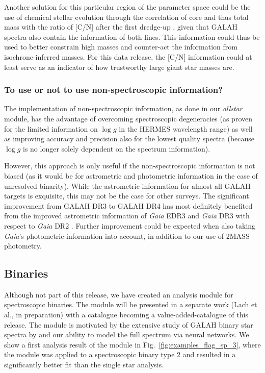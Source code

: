 \documentclass[
  journal=pasa,
  manuscript=research-paper, %
  year=2024,
  volume=37
]{cup-journal}
\newcommand{\logg}{$\log g$\xspace}
\begin{document}
Another solution for this particular region of the parameter space could be the use of chemical stellar evolution through the correlation of core and thus total mass with the ratio of [C/N] after the first dredge-up \citep{Masseron2015, Martig2016}, given that GALAH spectra also contain the information of both lines. This information could thus be used to better constrain high masses and counter-act the information from isochrone-inferred masses. For this data release, the [C/N] information could at least serve as an indicator of how trustworthy large giant star masses are.

\subsubsection{To use or not to use non-spectroscopic information?}

The implementation of non-spectroscopic information, as done in our \textit{allstar} module, has the advantage of overcoming spectroscopic degeneracies (as proven for the limited information on \logg in the HERMES wavelength range) as well as improving accuracy and precision also for the lowest quality spectra (because \logg is no longer solely dependent on the spectrum information).

However, this approach is only useful if the non-spectroscopic information is not biased (as it would be for astrometric and photometric information in the case of unresolved binarity). While the astrometric information for almost all GALAH targets is exquisite, this may not be the case for other surveys. The significant improvement from GALAH DR3 to GALAH DR4 has most definitely benefited from the improved astrometric information of \textit{Gaia} EDR3 \citep{GaiaEDR3, Lindegren2021a} and \textit{Gaia} DR3 \citep{GaiaDR3} with respect to \textit{Gaia} DR2 \citep{Brown2018, Lindegren2018}. Further improvement could be expected when also taking \textit{Gaia}'s photometric information into account, in addition to our use of 2MASS photometry.

\subsection{Binaries} \label{sec:caveats_binaries}

Although not part of this release, we have created an analysis module for spectroscopic binaries. The module will be presented in a separate work (Lach et al., in preparation) with a catalogue becoming a value-added-catalogue of this release. The module is motivated by the extensive study of GALAH binary star spectra by \citet{Traven2020} and our ability to model the full spectrum via neural networks. We show a first analysis result of the module in Fig.~\ref{fig:examples_flag_sp_3}, where the module was applied to a spectroscopic binary type 2 and resulted in a significantly better fit than the single star analysis.
\end{document}
